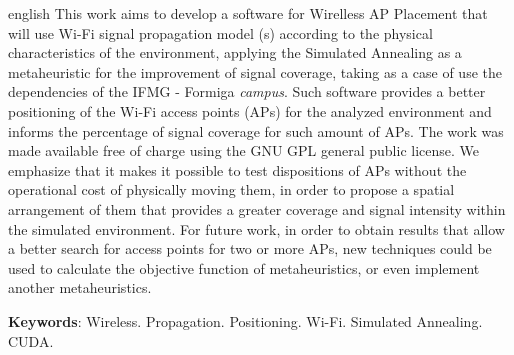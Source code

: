 \documentclass[
	12pt,				%
	twoside,			%
	a4paper,			%
	english,			%
	french,				%
	spanish,			%
	brazil				%
	]{abntex2}
\newcommand{\listofquadrosname}{Lista de quadros}
\begin{document}
\begin{resumo}[Abstract]
 \begin{otherlanguage*}{english}
   This work aims to develop a software for Wirelless AP Placement that
   will use Wi-Fi signal propagation model (s) according to the physical
   characteristics of the environment, applying the Simulated Annealing as
   a metaheuristic for the improvement of signal coverage, taking as a case
   of use the dependencies of the IFMG - Formiga \emph{campus}. Such
   software provides a better positioning of the Wi-Fi access points (APs)
   for the analyzed environment and informs the percentage of signal
   coverage for such amount of APs. The work was made available free of
   charge using the GNU GPL general public license. We emphasize that it
   makes it possible to test dispositions of APs without the operational
   cost of physically moving them, in order to propose a spatial
   arrangement of them that provides a greater coverage and signal
   intensity within the simulated environment. For future work, in order to
   obtain results that allow a better search for access points for two or
   more APs, new techniques could be used to calculate the objective
   function of metaheuristics, or even implement another metaheuristics.

   \vspace{\onelineskip}
 
   \noindent 
   \textbf{Keywords}: Wireless. Propagation. Positioning. Wi-Fi. Simulated Annealing. CUDA.
 \end{otherlanguage*}
\end{resumo}



\listoffigures*
\cleardoublepage


\pdfbookmark[0]{\listofquadrosname}{loq}
\listofquadros*
\cleardoublepage

\listoftables*
\cleardoublepage
\end{document}
